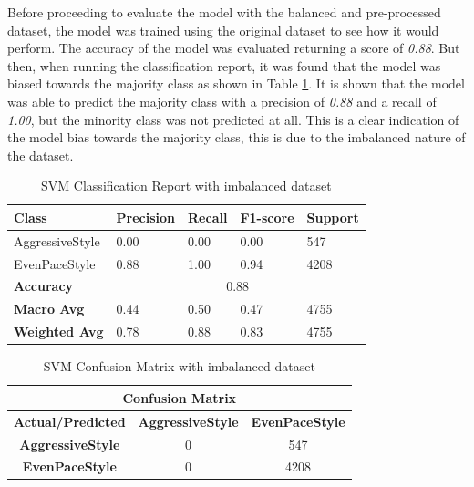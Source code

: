 \documentclass[10pt,journal,compsoc]{IEEEtran}
\begin{document}
Before proceeding to evaluate the model with the balanced and pre-processed dataset, the model was trained using the original dataset to see how it would perform. The accuracy of the model
was evaluated returning a score of \textit{0.88}. But then, when running the classification report, it was found that the model was biased towards the majority class as shown in 
Table \ref{table:svm_classification_report}.
It is shown that the model was able to predict the majority class with a precision of \textit{0.88} and a recall of \textit{1.00}, but the minority class was not predicted at all. This is a clear indication of the model bias towards 
the majority class, this is due to the imbalanced nature of the dataset.

\begin{table}[h]
    \centering
    \begin{tabular}{|l|l|l|l|l|}
    \hline
    \textbf{Class} & \textbf{Precision} & \textbf{Recall} & \textbf{F1-score} & \textbf{Support} \\ \hline
    AggressiveStyle & 0.00 & 0.00 & 0.00 & 547 \\ \hline
    EvenPaceStyle & 0.88 & 1.00 & 0.94 & 4208 \\ \hline
    \textbf{Accuracy} & \multicolumn{4}{c|}{0.88} \\ \hline
    \textbf{Macro Avg} & 0.44 & 0.50 & 0.47 & 4755 \\ \hline
    \textbf{Weighted Avg} & 0.78 & 0.88 & 0.83 & 4755 \\ \hline
    \end{tabular}
    \caption{SVM Classification Report with imbalanced dataset}
    \label{table:svm_classification_report}
\end{table}

\begin{table}[h]
    \centering
    \begin{tabular}{|c|c|c|}
    \hline
    \multicolumn{3}{|c|}{\textbf{Confusion Matrix}} \\
    \hline
    \textbf{Actual/Predicted} & \textbf{AggressiveStyle} & \textbf{EvenPaceStyle} \\ \hline
    \textbf{AggressiveStyle} & 0 & 547 \\ \hline
    \textbf{EvenPaceStyle} & 0 & 4208 \\ \hline
    \end{tabular}
    \caption{SVM Confusion Matrix with imbalanced dataset}
    \label{table:confusion_matrix}
\end{table}
\end{document}
